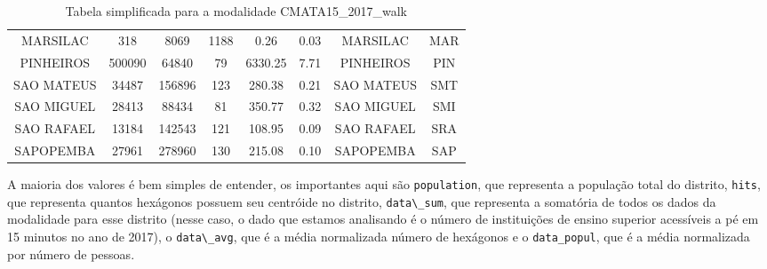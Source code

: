 \documentclass{article}
\begin{document}
\begin{table}[H]
\begin{tabular}{ c|c c c c c c c }
MARSILAC & 318 & 8069 & 1188 & 0.26 & 0.03 & MARSILAC & MAR \\
PINHEIROS & 500090 & 64840 & 79 & 6330.25 & 7.71 & PINHEIROS & PIN \\
SAO MATEUS & 34487 & 156896 & 123 & 280.38 & 0.21 & SAO MATEUS & SMT \\
SAO MIGUEL & 28413 & 88434 & 81 & 350.77 & 0.32 & SAO MIGUEL & SMI \\
SAO RAFAEL & 13184 & 142543 & 121 & 108.95 & 0.09 & SAO RAFAEL & SRA \\
SAPOPEMBA & 27961 & 278960 & 130 & 215.08 & 0.10 & SAPOPEMBA & SAP \\
\end{tabular}
\caption{Tabela simplificada{\protect\footnotemark} para a modalidade CMATA15\_2017\_walk}
\end{table}

\par A maioria dos valores é bem simples de entender, os importantes aqui são \verb|population|, 
que representa a população total do distrito, \verb|hits|, que representa quantos hexágonos possuem
seu centróide no distrito, \verb|data\_sum|, que representa a somatória de todos os
dados da modalidade para esse distrito (nesse caso, o dado que estamos analisando é o número de instituições
de ensino superior acessíveis a pé em 15 minutos no ano de 2017), o \verb|data\_avg|, que é a média normalizada
número de hexágonos e o \verb|data_popul|, que é a média normalizada por número de pessoas.

\end{document}

